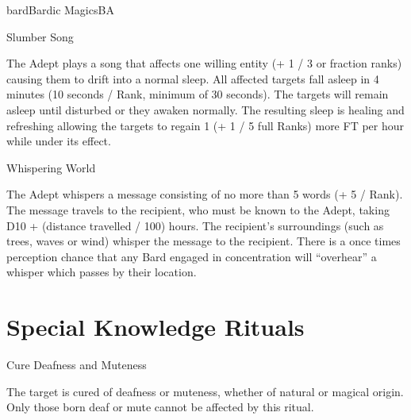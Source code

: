 \begin{College}[2.1]{bard}{Bardic Magics}{BA}
\begin{spell}[S-13]{Slumber Song}

\begin{effects}
The Adept plays a song that affects one willing entity (+ 1 / 3 or
fraction ranks) causing them to drift into a normal sleep.  All
affected targets fall asleep in 4 minutes (10 seconds / Rank, minimum
of 30 seconds).  The targets will remain asleep until disturbed or
they awaken normally.  The resulting sleep is healing and refreshing
allowing the targets to regain 1 (+ 1 / 5 full Ranks) more FT per
hour while under its effect.
\end{effects}
\end{spell}

\begin{spell}[S-14]{Whispering World}

\begin{effects}
The Adept whispers a message consisting of no more than 5 words (+ 5 /
Rank). The message travels to the recipient, who must be known to the
Adept, taking D10 + (distance travelled / 100) hours.  The recipient’s
surroundings (such as trees, waves or wind) whisper the message to the
recipient.  There is a once times perception chance that any Bard
engaged in concentration will “overhear” a whisper which passes by
their location.
\end{effects}
\end{spell}


\section{Special Knowledge Rituals}

\begin{ritual}[R-1]{Cure Deafness and Muteness}

\begin{effects}
The target is cured of deafness or muteness, whether of natural or
magical origin.  Only those born deaf or mute cannot be affected by
this ritual.
\end{effects}
\end{ritual}


\end{College}
